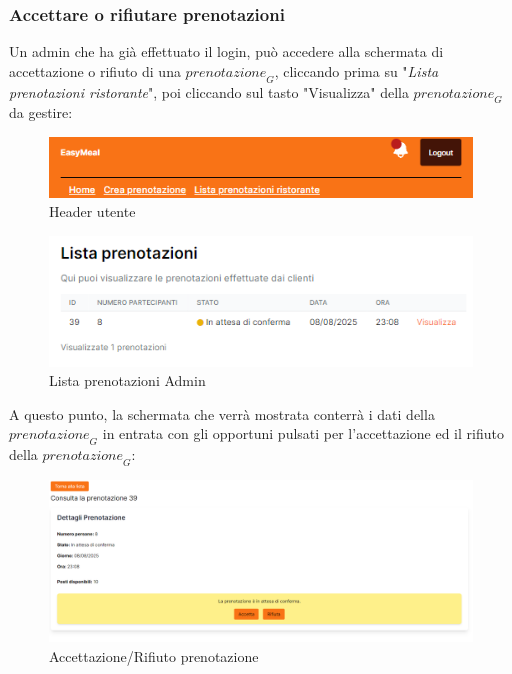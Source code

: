 \subsubsection{Accettare o rifiutare prenotazioni}
Un admin che ha già effettuato il login, può accedere alla schermata di accettazione o rifiuto di una $\textit{prenotazione}_G$, cliccando prima su "\emph{Lista prenotazioni ristorante}", poi cliccando sul tasto "Visualizza" della $\textit{prenotazione}_G$ da gestire:
\begin{figure}[H]
    \centering
    \includegraphics[width=0.6\linewidth]{img/Header_admin.png}
    \caption{Header utente}
    \label{fig:Header utente}
\end{figure}
\begin{figure}[H]
    \centering
    \includegraphics[width=0.6\linewidth]{img/lista_prenotazioni_admin.PNG}
    \caption{Lista prenotazioni Admin}
    \label{fig:Lista prenotazioni Admin}
\end{figure}

A questo punto, la schermata che verrà mostrata conterrà i dati della $\textit{prenotazione}_G$ in entrata con gli opportuni pulsati per l'accettazione ed il rifiuto della $\textit{prenotazione}_G$:
\begin{figure}[H]
    \centering
    \includegraphics[width=0.6\linewidth]{img/menu_accettazione_rifiuto.PNG}
    \caption{Accettazione/Rifiuto prenotazione}
    \label{fig:Accettazione/Rifiuto prenotazione}
\end{figure}

\newpage
